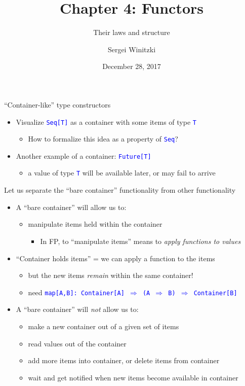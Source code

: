 \documentclass[english]{beamer}
\title[Chapter 4: Functors]{Chapter 4: Functors}
\subtitle{Their laws and structure}
\author{Sergei Winitzki}
\date{December 28, 2017}
\institute[ABTB]{Academy by the Bay}
\begin{document}
\frame{\titlepage}
\begin{frame}{``Container-like'' type constructors}

\begin{itemize}
\item Visualize \texttt{\textcolor{blue}{\footnotesize{}Seq{[}T{]}}} as
a container with some items of type \texttt{\textcolor{blue}{\footnotesize{}T}}{\footnotesize \par}
\begin{itemize}
\item How to formalize this idea as a property of \texttt{\textcolor{blue}{\footnotesize{}Seq}}?
\end{itemize}
\item Another example of a container: \texttt{\textcolor{blue}{\footnotesize{}Future{[}T{]}}}{\footnotesize \par}
\begin{itemize}
\item a value of type \texttt{\textcolor{blue}{\footnotesize{}T}} will be
available later, or may fail to arrive
\end{itemize}
\end{itemize}
Let us separate the ``bare container'' functionality from other
functionality
\begin{itemize}
\item A ``bare container'' will allow us to:
\begin{itemize}
\item manipulate items held within the container
\begin{itemize}
\item In FP, to ``manipulate items'' means to \emph{apply functions to
values}
\end{itemize}
\end{itemize}
\item ``Container holds items'' = we can apply a function to the items
\begin{itemize}
\item but the new items \emph{remain} within the same container!
\item need \texttt{\textcolor{blue}{\footnotesize{}map{[}A,B{]}:\ Container{[}A{]}
$\Rightarrow$ (A $\Rightarrow$ B) $\Rightarrow$ Container{[}B{]}}}{\footnotesize \par}
\end{itemize}
\item A ``bare container'' will \emph{not} allow us to:
\begin{itemize}
\item make a new container out of a given set of items
\item read values out of the container
\item add more items into container, or delete items from container
\item wait and get notified when new items become available in container
\end{itemize}
\end{itemize}
\end{frame}
\end{document}
